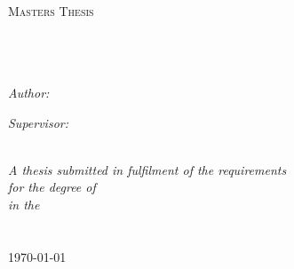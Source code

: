 \documentclass[11pt, oneside]{Thesis} %
\begin{document}
	\begin{titlepage}
		\begin{center}
			
			\textsc{\LARGE \univname}\\[1.5cm] %
			\textsc{\Large Masters Thesis}\\[0.5cm] %
			
			\HRule \\[0.4cm] %
			{\huge \bfseries \ttitle}\\[0.4cm] %
			\HRule \\[1.5cm] %
			
			\begin{minipage}{0.4\textwidth}
				\begin{flushleft} \large
					\emph{Author:}\\
					{\authornames} %
				\end{flushleft}
			\end{minipage}
			\begin{minipage}{0.4\textwidth}
				\begin{flushright} \large
					\emph{Supervisor:} \\
					\supname %
				\end{flushright}
			\end{minipage}\\[3cm]
			
			\large \textit{A thesis submitted in fulfilment of the requirements\\ for the degree of \degreename}\\[0.3cm] %
			\textit{in the}\\[0.4cm]
			\facname\\\deptname\\[2cm] %
			
			{\large \today}\\[4cm] %
			
			\vfill
		\end{center}
		
	\end{titlepage}
	
	
\end{document}
